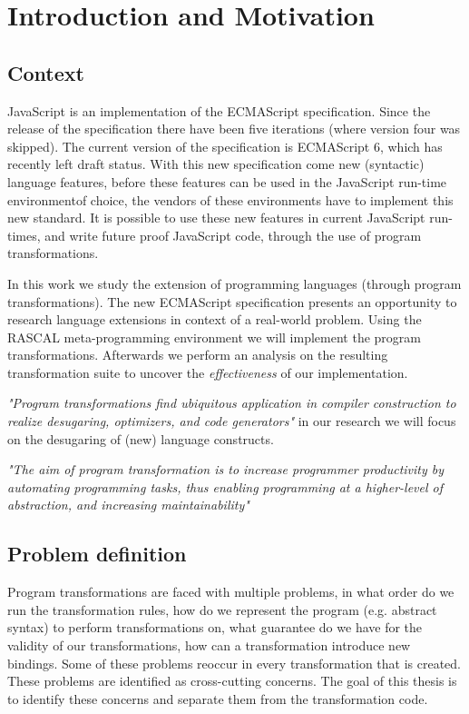 
\chapter{Introduction and Motivation}

\label{Chapter1}


\section{Context}
JavaScript is an implementation of the ECMAScript specification. Since the release of the  specification there have been five iterations (where version four was skipped). The current version of the specification is ECMAScript 6, which has recently left draft status. With this new specification come new (syntactic) language features, before these features can be used in the JavaScript run-time environment\footnotemark of choice, the vendors of these environments have to implement this new standard. It is possible to use these new features in current JavaScript run-times, and write future proof JavaScript code, through the use of program transformations.

In this work we study the extension of programming languages (through program transformations). The new ECMAScript specification presents an opportunity to research language extensions in context of a real-world problem. Using the RASCAL meta-programming environment\citep{Klint} we will implement the program transformations. Afterwards we perform an analysis on the resulting transformation suite to uncover the \emph{effectiveness} of our implementation.

\textit{"Program transformations find ubiquitous application in compiler construction to realize desugaring, optimizers, and code generators"}\cite{Erdweg2014} 
in our research we will focus on the desugaring of (new) language constructs.  

\textit{"The aim of program transformation is to increase programmer productivity by automating programming tasks, thus enabling programming at a higher-level of abstraction, and increasing maintainability"}\cite{Visser2001}

\section{Problem definition}
Program transformations are faced with multiple problems, in what order do we run the transformation rules, how do we represent the program (e.g. abstract syntax) to perform transformations on, what guarantee do we have for the validity of our transformations, how can a transformation introduce new bindings.  
Some of these problems reoccur in every transformation that is created. These problems are identified as cross-cutting concerns. The goal of this thesis is to identify these concerns and separate them from the transformation code. 

